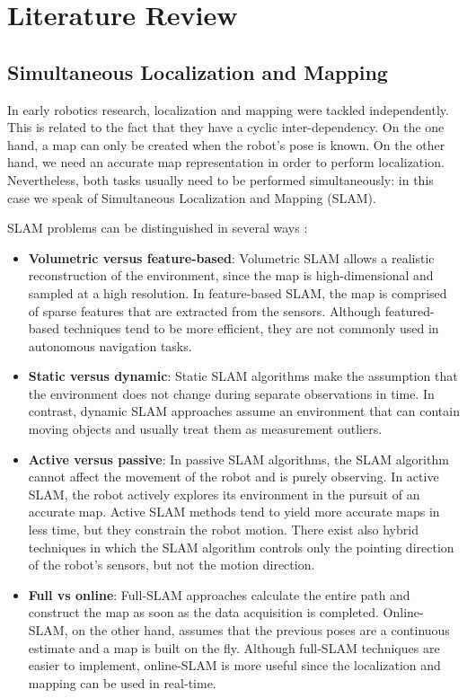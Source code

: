 \section{Literature Review}

\subsection{Simultaneous Localization and Mapping}

In early robotics research, localization and mapping were tackled
independently.
This is related to the fact that they have a cyclic inter-dependency.
On the one hand, a map can only be created when the robot’s pose is known.
On the other hand, we need an accurate map representation in order to
perform localization.
Nevertheless, both tasks usually need to be performed simultaneously:
in this case we speak of Simultaneous Localization and Mapping (SLAM).

SLAM problems can be distinguished in several ways \parencite{Jefferies2008}:
\begin{itemize}
    \item \textbf{Volumetric versus feature-based}:
        Volumetric SLAM allows a realistic reconstruction of the environment,
        since the map is high-dimensional and sampled at a high resolution.
        In feature-based SLAM, the map is comprised of sparse features
        that are extracted from the sensors.
        Although featured-based techniques tend to be more efficient,
        they are not commonly used in autonomous navigation tasks.
    \item \textbf{Static versus dynamic}:
        Static SLAM algorithms make the assumption that the environment
        does not change during separate observations in time.
        In contrast, dynamic SLAM approaches assume an environment that
        can contain moving objects and usually treat them as
        measurement outliers.
    \item \textbf{Active versus passive}:
        In passive SLAM algorithms, the SLAM algorithm cannot affect the
        movement of the robot and is purely observing.
        In active SLAM, the robot actively explores its environment in
        the pursuit of an accurate map.
        Active SLAM methods tend to yield more accurate maps in less time,
        but they constrain the robot motion.
        There exist also hybrid techniques in which the SLAM algorithm
        controls only the pointing direction of the robot's sensors,
        but not the motion direction.
    \item \textbf{Full vs online}:
        Full-SLAM approaches calculate the entire path and construct the
        map as soon as the data acquisition is completed.
        Online-SLAM, on the other hand, assumes that the previous poses are a
        continuous estimate and a map is built on the fly.
        Although full-SLAM techniques are easier to implement, online-SLAM
        is more useful since the localization and mapping can be used in
        real-time.
\end{itemize}

